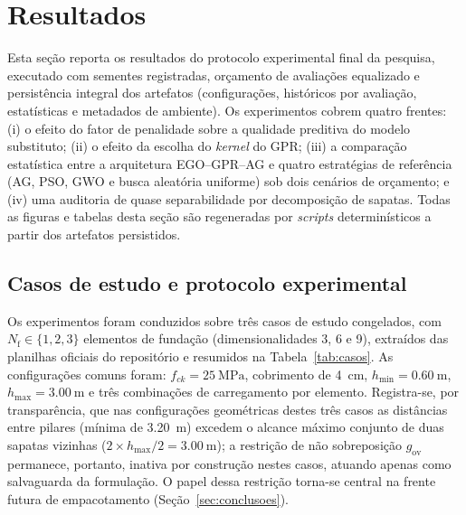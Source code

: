 \section{Resultados}
\label{sec:resultados}

Esta seção reporta os resultados do protocolo experimental final da pesquisa, executado com sementes registradas, orçamento de avaliações equalizado e persistência integral dos artefatos (configurações, históricos por avaliação, estatísticas e metadados de ambiente). Os experimentos cobrem quatro frentes: (i) o efeito do fator de penalidade sobre a qualidade preditiva do modelo substituto; (ii) o efeito da escolha do \textit{kernel} do GPR; (iii) a comparação estatística entre a arquitetura EGO--GPR--AG e quatro estratégias de referência (AG, PSO, GWO e busca aleatória uniforme) sob dois cenários de orçamento; e (iv) uma auditoria de quase separabilidade por decomposição de sapatas. Todas as figuras e tabelas desta seção são regeneradas por \textit{scripts} determinísticos a partir dos artefatos persistidos.

\subsection{Casos de estudo e protocolo experimental}
\label{sec:res_casos}

Os experimentos foram conduzidos sobre três casos de estudo congelados, com $N_{\mathrm{f}} \in \{1, 2, 3\}$ elementos de fundação (dimensionalidades 3, 6 e 9), extraídos das planilhas oficiais do repositório e resumidos na Tabela~\ref{tab:casos}. As configurações comuns foram: $f_{ck} = \SI{25}{\mega\pascal}$, cobrimento de \SI{4}{\centi\meter}, $h_{\min} = \SI{0,60}{\meter}$, $h_{\max} = \SI{3,00}{\meter}$ e três combinações de carregamento por elemento. Registra-se, por transparência, que nas configurações geométricas destes três casos as distâncias entre pilares (mínima de \SI{3,20}{\meter}) excedem o alcance máximo conjunto de duas sapatas vizinhas ($2 \times h_{\max}/2 = \SI{3,00}{\meter}$); a restrição de não sobreposição $g_{\mathrm{ov}}$ permanece, portanto, inativa por construção nestes casos, atuando apenas como salvaguarda da formulação. O papel dessa restrição torna-se central na frente futura de empacotamento (Seção~\ref{sec:conclusoes}).



